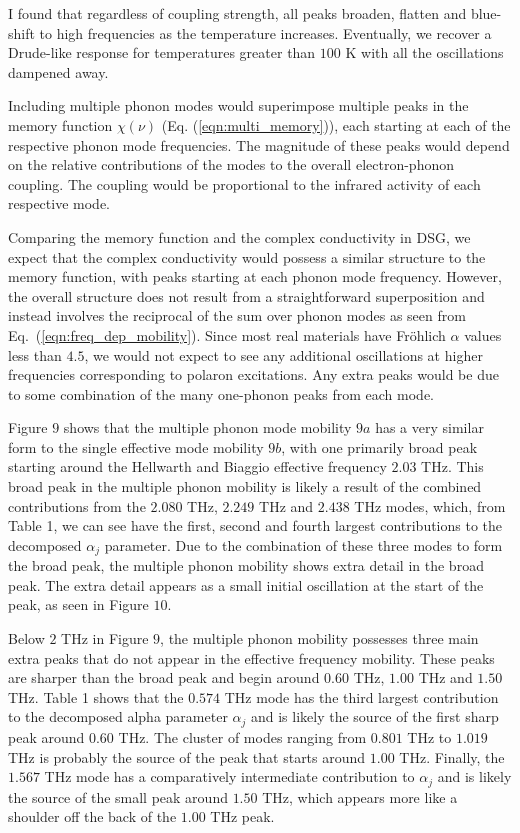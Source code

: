 I found that regardless of coupling strength, all peaks broaden, flatten and blue-shift to high frequencies as the temperature increases. Eventually, we recover a Drude-like response for temperatures greater than $100$ K with all the oscillations dampened away. 

Including multiple phonon modes would superimpose multiple peaks in the memory function $\chi(\nu)$ (Eq. (\ref{eqn:multi_memory})), each starting at each of the respective phonon mode frequencies. The magnitude of these peaks would depend on the relative contributions of the modes to the overall electron-phonon coupling. The coupling would be proportional to the infrared activity of each respective mode. 

Comparing the memory function and the complex conductivity in DSG, we expect that the complex conductivity would possess a similar structure to the memory function, with peaks starting at each phonon mode frequency. However, the overall structure does not result from a straightforward superposition and instead involves the reciprocal of the sum over phonon modes as seen from Eq.~(\ref{eqn:freq_dep_mobility}). Since most real materials have Fr\"ohlich $\alpha$ values less than $4.5$, we would not expect to see any additional oscillations at higher frequencies corresponding to polaron excitations. Any extra peaks would be due to some combination of the many one-phonon peaks from each mode. 

Figure $9$ shows that the multiple phonon mode mobility $9a$ has a very similar form to the single effective mode mobility $9b$, with one primarily broad peak starting around the Hellwarth and Biaggio effective frequency $2.03$ THz. This broad peak in the multiple phonon mobility is likely a result of the combined contributions from the $2.080$ THz, $2.249$ THz and $2.438$ THz modes, which, from Table 1, we can see have the first, second and fourth largest contributions to the decomposed $\alpha_j$ parameter. Due to the combination of these three modes to form the broad peak, the multiple phonon mobility shows extra detail in the broad peak. The extra detail appears as a small initial oscillation at the start of the peak, as seen in Figure $10$. 

Below $2$ THz in Figure $9$, the multiple phonon mobility possesses three main extra peaks that do not appear in the effective frequency mobility. These peaks are sharper than the broad peak and begin around $0.60$ THz, $1.00$ THz and $1.50$ THz. Table 1 shows that the $0.574$ THz mode has the third largest contribution to the decomposed alpha parameter $\alpha_j$ and is likely the source of the first sharp peak around $0.60$ THz. The cluster of modes ranging from $0.801$ THz to $1.019$ THz is probably the source of the peak that starts around $1.00$ THz. Finally, the $1.567$ THz mode has a comparatively intermediate contribution to $\alpha_j$ and is likely the source of the small peak around $1.50$ THz, which appears more like a shoulder off the back of the $1.00$ THz peak.

